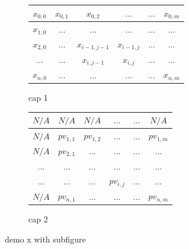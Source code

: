 \begin{figure}
	\centering
	
	\begin{subfigure}{\linewidth}
		\centering
		
		\begin{tabular}{|c | c |c | c |c | c |} \hline
			$x_{0, 0}$ & $x_{0, 1}$ & $x_{0, 2}$                         & $\dots$                           & $\dots$ & $x_{0, m}$ \\ \hline
			$x_{1, 0}$ & $\dots$    & $\dots$                            & $\dots$                           & $\dots$ & $\dots$    \\ \hline 
			$x_{2, 0}$ & $\dots$    & \cellcolor{blue!10} $x_{i-1, j-1}$ & \cellcolor{blue!10}$x_{i - 1, j}$ & $\dots$ & $\dots$    \\ \hline 
			$\dots$    & $\dots$    & \cellcolor{blue!10}$x_{i, j - 1}$  & \cellcolor{blue!10}$x_{i, j}$     & $\dots$ & $\dots$    \\ \hline 
			$x_{n, 0}$ & $\dots$    & $\dots$                            & $\dots$                           & $\dots$ & $x_{n, m}$ \\ \hline 
		\end{tabular}
	\caption{cap 1}
	\end{subfigure}

	\begin{subfigure}{\linewidth}
		\centering
		
		\begin{tabular}{|c | c |c | c |c | c |} \hline
			\rowcolor{lightgray}
			\cellcolor{lightgray}$N/A$   & $N/A$       & $N/A$       & $\dots$                        & $\dots$ & $N/A$       \\ \hline
			\cellcolor{lightgray}$N/A$   & $pv_{1, 1}$ & $pv_{1, 2}$ & $\dots$                        & $\dots$ & $pv_{1, m}$ \\ \hline
			\cellcolor{lightgray}$N/A$   & $pv_{2, 1}$ & $\dots$     & $\dots$                        & $\dots$ & $\dots$     \\ \hline 
			\cellcolor{lightgray}$\dots$ & $\dots$     & $\dots$     & $\dots$                        & $\dots$ & $\dots$     \\ \hline 
			\cellcolor{lightgray}$\dots$ & $\dots$     & $\dots$     & \cellcolor{blue!10}$pv_{i, j}$ & $\dots$ & $\dots$     \\ \hline 
			\cellcolor{lightgray}$N/A$   & $pv_{n, 1}$ & $\dots$     & $\dots$                        & $\dots$ & $pv_{n, m}$ \\ \hline 
		\end{tabular}
		\caption{cap 2}
	\end{subfigure}


	
	\caption{demo x with subfigure}

\end{figure}





